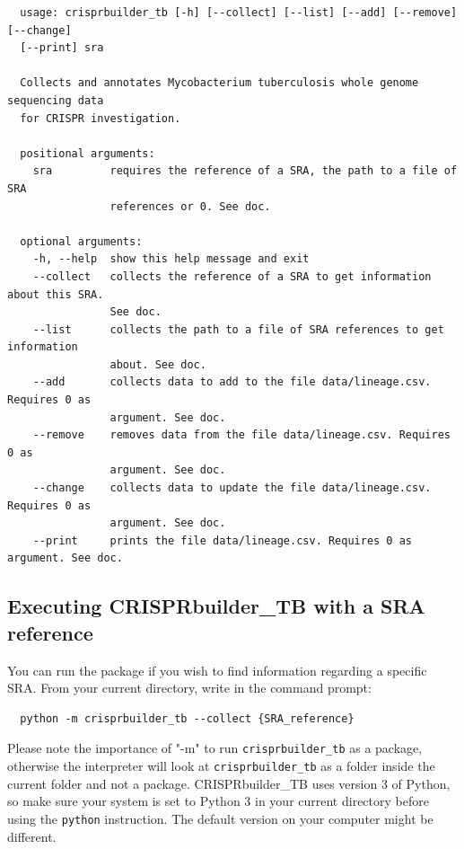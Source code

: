 \documentclass[twoside,a4paper,11pt,frenchb,openany]{report}
\begin{document}
    \begin{verbatim}
  usage: crisprbuilder_tb [-h] [--collect] [--list] [--add] [--remove] [--change]
  [--print] sra

  Collects and annotates Mycobacterium tuberculosis whole genome sequencing data
  for CRISPR investigation.

  positional arguments:
    sra         requires the reference of a SRA, the path to a file of SRA 
                references or 0. See doc.

  optional arguments:
    -h, --help  show this help message and exit
    --collect   collects the reference of a SRA to get information about this SRA. 
                See doc.
    --list      collects the path to a file of SRA references to get information 
                about. See doc.
    --add       collects data to add to the file data/lineage.csv. Requires 0 as 
                argument. See doc.
    --remove    removes data from the file data/lineage.csv. Requires 0 as 
                argument. See doc.
    --change    collects data to update the file data/lineage.csv. Requires 0 as
                argument. See doc.
    --print     prints the file data/lineage.csv. Requires 0 as argument. See doc.
\end{verbatim}



    \subsection{Executing CRISPRbuilder\_TB with a SRA
reference}\label{executing-crisprbuilder_tb-with-a-sra-reference}

    You can run the package if you wish to find information regarding a
specific SRA. From your current directory, write in the command prompt:

    \begin{verbatim}
  python -m crisprbuilder_tb --collect {SRA_reference}
\end{verbatim}

    Please note the importance of "-m" to run \texttt{crisprbuilder\_tb} as a
package, otherwise the interpreter will look at \texttt{crisprbuilder\_tb} as a folder inside the current folder and not a package. CRISPRbuilder\_TB uses version 3 of Python, so make sure your system is set to Python 3 in your current directory before using the
\texttt{python} instruction. The default version on your computer might
be different.
\end{document}
